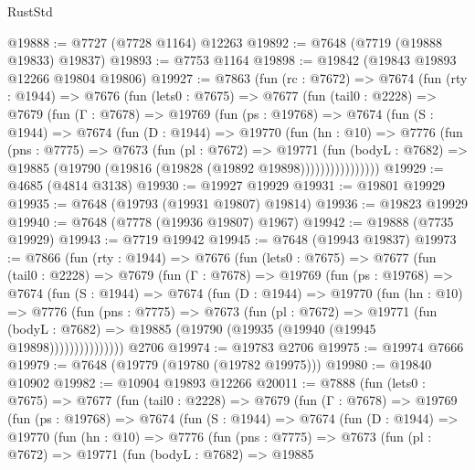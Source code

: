\begin{lexlean}{RustStd}
\begin{coremodule}
{\begin{coremodule}
{{{{{{{{{{{{{{{{{{{{{{{{{{{{{{{{{{{{{{{{{{{{{{{{{{{{{@19888 := @7727 (@7728 @1164) @12263
@19892 := @7648 (@7719 (@19888 @19833) @19837)
@19893 := @7753 @1164
@19898 := @19842 (@19843 @19893 @12266 @19804 @19806)
@19927 := @7863
    (fun (rc : @7672) =>
    @7674
      (fun (rty : @1944) =>
      @7676
        (fun (lets0 : @7675) =>
        @7677
          (fun (tail0 : @2228) =>
          @7679
            (fun (Γ : @7678) =>
            @19769
              (fun (ps : @19768) =>
              @7674
                (fun (S : @1944) =>
                @7674
                  (fun (D : @1944) =>
                  @19770
                    (fun (hn : @10) =>
                    @7776
                      (fun (pns : @7775) =>
                      @7673
                        (fun (pl : @7672) =>
                        @19771
                          (fun (bodyL : @7682) =>
                          @19885 (@19790 (@19816 (@19828 (@19892 @19898))))))))))))))))
@19929 := @4685 (@4814 @3138)
@19930 := @19927 @19929
@19931 := @19801 @19929
@19935 := @7648 (@19793 (@19931 @19807) @19814)
@19936 := @19823 @19929
@19940 := @7648 (@7778 (@19936 @19807) @1967)
@19942 := @19888 (@7735 @19929)
@19943 := @7719 @19942
@19945 := @7648 (@19943 @19837)
@19973 := @7866
    (fun (rty : @1944) =>
    @7676
      (fun (lets0 : @7675) =>
      @7677
        (fun (tail0 : @2228) =>
        @7679
          (fun (Γ : @7678) =>
          @19769
            (fun (ps : @19768) =>
            @7674
              (fun (S : @1944) =>
              @7674
                (fun (D : @1944) =>
                @19770
                  (fun (hn : @10) =>
                  @7776
                    (fun (pns : @7775) =>
                    @7673
                      (fun (pl : @7672) =>
                      @19771
                        (fun (bodyL : @7682) =>
                        @19885 (@19790 (@19935 (@19940 (@19945 @19898)))))))))))))))
    @2706
@19974 := @19783 @2706
@19975 := @19974 @7666
@19979 := @7648 (@19779 (@19780 (@19782 @19975)))
@19980 := @19840 @10902
@19982 := @10904 @19893 @12266
@20011 := @7888
    (fun (lets0 : @7675) =>
    @7677
      (fun (tail0 : @2228) =>
      @7679
        (fun (Γ : @7678) =>
        @19769
          (fun (ps : @19768) =>
          @7674
            (fun (S : @1944) =>
            @7674
              (fun (D : @1944) =>
              @19770
                (fun (hn : @10) =>
                @7776
                  (fun (pns : @7775) =>
                  @7673
                    (fun (pl : @7672) =>
                    @19771
                      (fun (bodyL : @7682) =>
                      @19885
}}}}}}}}}}}}}}}}}}}}}}}}}}}}}}}}}}}}}}}}}}}}}}}}}}}}}
\end{coremodule}}
\end{coremodule}
\end{lexlean}

